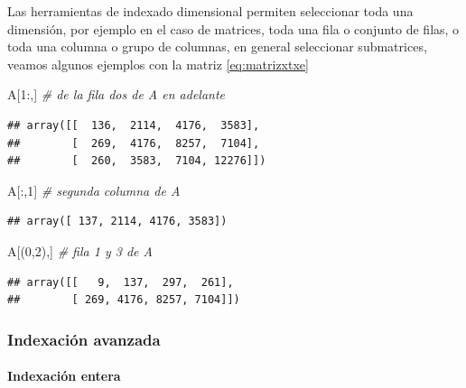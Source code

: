 \documentclass[
]{book}
\newenvironment{Shaded}{\begin{snugshade}}{\end{snugshade}}
\newcommand{\CommentTok}[1]{\textcolor[rgb]{0.56,0.35,0.01}{\textit{#1}}}
\newcommand{\DecValTok}[1]{\textcolor[rgb]{0.00,0.00,0.81}{#1}}
\newcommand{\NormalTok}[1]{#1}
\theoremstyle{definition}
\theoremstyle{definition}
\theoremstyle{definition}
\theoremstyle{definition}
\theoremstyle{remark}
\begin{document}
Las herramientas de indexado dimensional permiten seleccionar toda una dimensión, por ejemplo en el caso de matrices, toda una fila o conjunto de filas, o toda una columna o grupo de columnas, en general seleccionar submatrices, veamos algunos ejemplos con la matriz \eqref{eq:matrizxtxe}

\begin{Shaded}
\begin{Highlighting}[]
\NormalTok{A[}\DecValTok{1}\NormalTok{:,]  }\CommentTok{\# de la fila dos de A  en adelante }
\end{Highlighting}
\end{Shaded}

\begin{verbatim}
## array([[  136,  2114,  4176,  3583],
##        [  269,  4176,  8257,  7104],
##        [  260,  3583,  7104, 12276]])
\end{verbatim}

\begin{Shaded}
\begin{Highlighting}[]
\NormalTok{A[:,}\DecValTok{1}\NormalTok{]  }\CommentTok{\# segunda columna de A }
\end{Highlighting}
\end{Shaded}

\begin{verbatim}
## array([ 137, 2114, 4176, 3583])
\end{verbatim}

\begin{Shaded}
\begin{Highlighting}[]
\NormalTok{A[(}\DecValTok{0}\NormalTok{,}\DecValTok{2}\NormalTok{),] }\CommentTok{\# fila 1 y 3 de A }
\end{Highlighting}
\end{Shaded}

\begin{verbatim}
## array([[   9,  137,  297,  261],
##        [ 269, 4176, 8257, 7104]])
\end{verbatim}

\hypertarget{indexaciuxf3n-avanzada}{%
\subsubsection{Indexación avanzada}\label{indexaciuxf3n-avanzada}}

\hypertarget{indexaciuxf3n-entera}{%
\paragraph{Indexación entera}\label{indexaciuxf3n-entera}}
\end{document}
